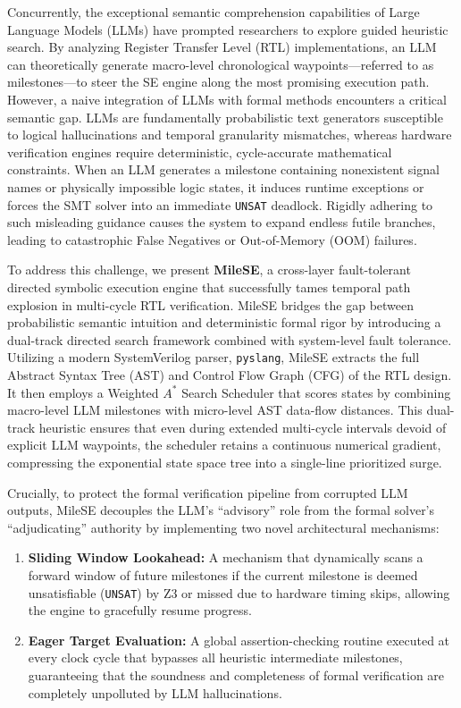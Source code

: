 \documentclass[conference]{IEEEtran}
\begin{document}
Concurrently, the exceptional semantic comprehension capabilities of Large Language Models (LLMs) have prompted researchers to explore guided heuristic search. By analyzing Register Transfer Level (RTL) implementations, an LLM can theoretically generate macro-level chronological waypoints—referred to as milestones—to steer the SE engine along the most promising execution path. However, a naive integration of LLMs with formal methods encounters a critical semantic gap. LLMs are fundamentally probabilistic text generators susceptible to logical hallucinations and temporal granularity mismatches, whereas hardware verification engines require deterministic, cycle-accurate mathematical constraints. When an LLM generates a milestone containing nonexistent signal names or physically impossible logic states, it induces runtime exceptions or forces the SMT solver into an immediate \texttt{UNSAT} deadlock. Rigidly adhering to such misleading guidance causes the system to expand endless futile branches, leading to catastrophic False Negatives or Out-of-Memory (OOM) failures.

To address this challenge, we present \textbf{MileSE}, a cross-layer fault-tolerant directed symbolic execution engine that successfully tames temporal path explosion in multi-cycle RTL verification. MileSE bridges the gap between probabilistic semantic intuition and deterministic formal rigor by introducing a dual-track directed search framework combined with system-level fault tolerance. Utilizing a modern SystemVerilog parser, \texttt{pyslang}, MileSE extracts the full Abstract Syntax Tree (AST) and Control Flow Graph (CFG) of the RTL design. It then employs a Weighted $A^*$ Search Scheduler that scores states by combining macro-level LLM milestones with micro-level AST data-flow distances. This dual-track heuristic ensures that even during extended multi-cycle intervals devoid of explicit LLM waypoints, the scheduler retains a continuous numerical gradient, compressing the exponential state space tree into a single-line prioritized surge.

Crucially, to protect the formal verification pipeline from corrupted LLM outputs, MileSE decouples the LLM's ``advisory'' role from the formal solver's ``adjudicating'' authority by implementing two novel architectural mechanisms:
\begin{enumerate}
    \item \textbf{Sliding Window Lookahead:} A mechanism that dynamically scans a forward window of future milestones if the current milestone is deemed unsatisfiable (\texttt{UNSAT}) by Z3 or missed due to hardware timing skips, allowing the engine to gracefully resume progress.
    \item \textbf{Eager Target Evaluation:} A global assertion-checking routine executed at every clock cycle that bypasses all heuristic intermediate milestones, guaranteeing that the soundness and completeness of formal verification are completely unpolluted by LLM hallucinations.
\end{enumerate}
\end{document}
